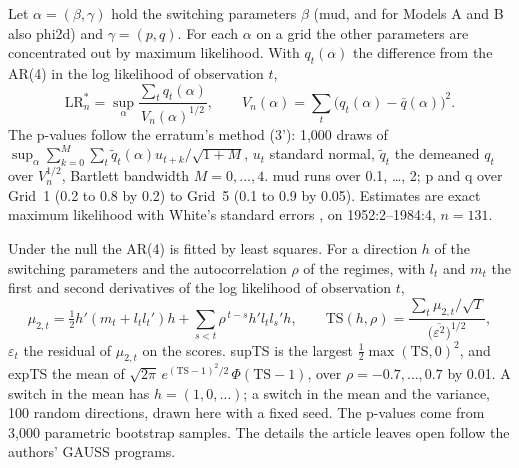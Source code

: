 Let $\alpha=(\beta,\gamma)$ hold the switching parameters $\beta$ (mud, and for Models A and B also phi2d) and $\gamma=(p,q)$. For each $\alpha$ on a grid the other parameters are concentrated out by maximum likelihood. With $q_t(\alpha)$ the difference from the AR(4) in the log likelihood of observation $t$,
\[
\mathrm{LR}^*_n=\sup_\alpha \frac{\sum_t q_t(\alpha)}{V_n(\alpha)^{1/2}},\qquad V_n(\alpha)=\sum_t\bigl(q_t(\alpha)-\bar q(\alpha)\bigr)^2 .
\]
The p-values follow the erratum's method (3'): 1,000 draws of $\sup_\alpha\sum_{k=0}^{M}\sum_t \tilde q_t(\alpha)u_{t+k}/\sqrt{1+M}$, $u_t$ standard normal, $\tilde q_t$ the demeaned $q_t$ over $V_n^{1/2}$, Bartlett bandwidth $M=0,\dots,4$. mud runs over 0.1, \dots, 2; p and q over Grid~1 (0.2 to 0.8 by 0.2) to Grid~5 (0.1 to 0.9 by 0.05). Estimates are exact maximum likelihood with White's standard errors , on 1952:2--1984:4, $n=131$.

Under the null the AR(4) is fitted by least squares. For a direction $h$ of the switching parameters and the autocorrelation $\rho$ of the regimes, with $l_t$ and $m_t$ the first and second derivatives of the log likelihood of observation $t$,
\[
\mu_{2,t}=\tfrac12 h'(m_t+l_tl_t')h+\sum_{s<t}\rho^{\,t-s}h'l_tl_s'h,\qquad
\mathrm{TS}(h,\rho)=\frac{\sum_t\mu_{2,t}/\sqrt{T}}{\bigl(\overline{\varepsilon^2}\bigr)^{1/2}},
\]
$\varepsilon_t$ the residual of $\mu_{2,t}$ on the scores. supTS is the largest $\tfrac12\max(\mathrm{TS},0)^2$, and expTS the mean of $\sqrt{2\pi}\,e^{(\mathrm{TS}-1)^2/2}\,\Phi(\mathrm{TS}-1)$, over $\rho=-0.7,\dots,0.7$ by 0.01. A switch in the mean has $h=(1,0,\dots)$; a switch in the mean and the variance, 100 random directions, drawn here with a fixed seed. The p-values come from 3,000 parametric bootstrap samples. The details the article leaves open follow the authors' GAUSS programs.

